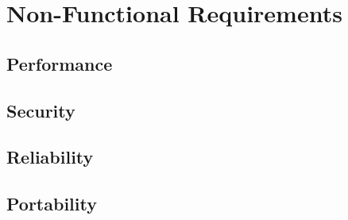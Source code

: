 \section{Non-Functional Requirements}




\subsection{Performance}



\subsection{Security}



\subsection{Reliability}



\subsection{Portability}






%
%
